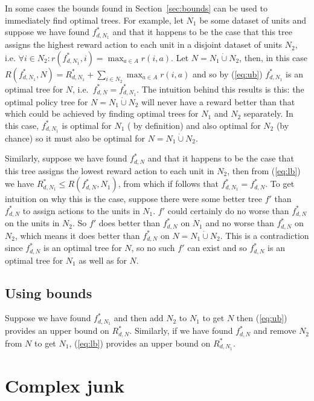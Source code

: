 \documentclass{article}
\begin{document}
In some cases the bounds found in Section~\ref{sec:bounds} can be used
to immediately find optimal trees. For example, let $N_1$ be some
dataset of units and suppose we have found $f^{*}_{d,N_{1}}$ and that
it happens to be the case that this tree assigns the highest reward
action to each unit in a disjoint dataset of units $N_2$, i.e.
$\forall i \in N_{2} : r(f^{*}_{d,N_{1}},i) = \max_{a \in A}
r(i,a)$. Let $N = N_{1} \dot\cup N_{2}$, then, in this case
$R(f^{*}_{d,N_{1}},N) = R^{*}_{d,N_{1}} + \sum_{i \in N_{2}} \max_{a
  \in A} r(i,a)$ and so by (\ref{eq:ub}) $f^{*}_{d,N_{1}}$ is an
optimal tree for $N$, i.e.\ $f^{*}_{d,N} = f^{*}_{d,N_{1}}$. The
intuition behind this results is this: the optimal policy tree for
$N = N_{1} \dot\cup N_{2}$ will never have a reward better than that
which could be achieved by finding optimal trees for $N_1$ and $N_2$
separately. In this case, $f^{*}_{d,N_{1}}$ is optimal for $N_1$ ( by
definition) and also optimal for $N_2$ (by chance) so it must also be
optimal for $N = N_{1} \dot\cup N_{2}$.

Similarly, suppose we have found $f^{*}_{d,N}$ and that it happens to
be the case that this tree assigns the lowest reward action to each
unit in $N_2$, then from (\ref{eq:lb}) we have
$R^{*}_{d,N_{1}} \leq R(f^{*}_{d,N},N_{1})$, from which if follows
that $f^{*}_{d,N_{1}} = f^{*}_{d,N}$. To get intuition on why this is
the case, suppose there were some better tree $f'$ than $f^{*}_{d,N}$
to assign actions to the units in $N_1$. $f'$ could certainly do no
worse than $f^{*}_{d,N}$ on the units in $N_2$. So $f'$ does better
than $f^{*}_{d,N}$ on $N_1$ and no worse than $f^{*}_{d,N}$ on $N_2$,
which means it does better than $f^{*}_{d,N}$ on $N = N_{1} \dot\cup
N_{2}$. This is a contradiction since $f^{*}_{d,N}$ is an optimal tree
for $N$, so no such $f'$ can exist and so $f^{*}_{d,N}$ is an optimal
tree for $N_1$ as well as for $N$.


\subsection{Using bounds}
\label{sec:usingbounds}



Suppose we have found $f^{*}_{d,N_{1}}$
and then add $N_2$ to $N_{1}$ to get $N$ then (\ref{eq:ub}) provides
an upper bound on $R^{*}_{d,N}$. Similarly, if we have found
$f^{*}_{d,N}$ and remove $N_2$ from $N$ to get $N_1$, (\ref{eq:lb})
provides an upper bound on $R^{*}_{d,N_{1}}$.


\section{Complex junk}
\label{sec:junk}
\end{document}
